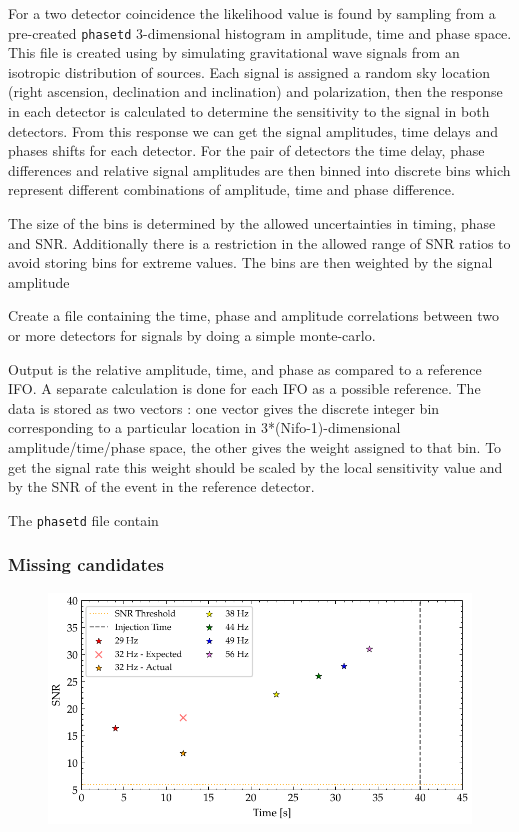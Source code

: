 For a two detector coincidence the likelihood value is found by sampling from a pre-created \verb|phasetd| 3-dimensional histogram in amplitude, time and phase space. This file is created using by simulating gravitational wave signals from an isotropic distribution of sources. Each signal is assigned a random sky location (right ascension, declination and inclination) and polarization, then the response in each detector is calculated to determine the sensitivity to the signal in both detectors. From this response we can get the signal amplitudes, time delays and phases shifts for each detector. For the pair of detectors the time delay, phase differences and relative signal amplitudes are then binned into discrete bins which represent different combinations of amplitude, time and phase difference.

The size of the bins is determined by the allowed uncertainties in timing, phase and SNR. Additionally there is a restriction in the allowed range of SNR ratios to avoid storing bins for extreme values. The bins are then weighted by the signal amplitude 



Create a file containing the time, phase and amplitude correlations between two
or more detectors for signals by doing a simple monte-carlo.

Output is the relative amplitude, time, and phase as compared to a reference
IFO. A separate calculation is done for each IFO as a possible reference.  The
data is stored as two vectors : one vector gives the discrete integer bin
corresponding to a particular location in 3*(Nifo-1)-dimensional
amplitude/time/phase space, the other gives the weight assigned to that bin.
To get the signal rate this weight should be scaled by the local sensitivity
value and by the SNR of the event in the reference detector.

The \verb|phasetd| file contain 

\subsubsection{\label{6:sec:missing-cands}Missing candidates}
%
\begin{figure}
       \centering
    \includegraphics[width=\textwidth]{images/6_earlywarning/identified-problems/non_mono_snr.pdf}
    \caption{}
    \label{6:fig:non-monotonic-snr}
\end{figure}
%

